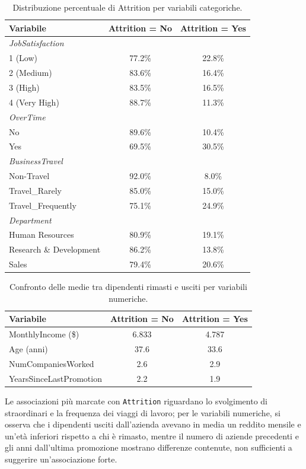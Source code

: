 \documentclass[12pt, a4paper]{article}
\begin{document}
\begin{table}[H]
\centering
\begin{tabular}{lcc}
\toprule
\textbf{Variabile} & \textbf{Attrition = No} & \textbf{Attrition = Yes} \\
\midrule
\multicolumn{3}{l}{\textit{JobSatisfaction}} \\
\midrule
1 (Low) & 77.2\% & 22.8\% \\
2 (Medium) & 83.6\% & 16.4\% \\
3 (High) & 83.5\% & 16.5\% \\
4 (Very High) & 88.7\% & 11.3\% \\
\midrule
\multicolumn{3}{l}{\textit{OverTime}} \\
\midrule
No & 89.6\% & 10.4\% \\
Yes & 69.5\% & 30.5\% \\
\midrule
\multicolumn{3}{l}{\textit{BusinessTravel}} \\
\midrule
Non-Travel & 92.0\% & 8.0\% \\
Travel\_Rarely & 85.0\% & 15.0\% \\
Travel\_Frequently & 75.1\% & 24.9\% \\
\midrule
\multicolumn{3}{l}{\textit{Department}} \\
\midrule
Human Resources & 80.9\% & 19.1\% \\
Research \& Development & 86.2\% & 13.8\% \\
Sales & 79.4\% & 20.6\% \\
\bottomrule
\end{tabular}
\caption{Distribuzione percentuale di Attrition per variabili categoriche.}
\end{table}

\begin{table}[H]
\centering
\begin{tabular}{lcc}
\toprule
\textbf{Variabile} & \textbf{Attrition = No} & \textbf{Attrition = Yes} \\
\midrule
MonthlyIncome (\$) & 6.833 & 4.787 \\
Age (anni) & 37.6 & 33.6 \\
NumCompaniesWorked & 2.6 & 2.9 \\
YearsSinceLastPromotion & 2.2 & 1.9 \\
\bottomrule
\end{tabular}
\caption{Confronto delle medie tra dipendenti rimasti e usciti per variabili numeriche.}
\end{table}
 
Le associazioni più marcate con \texttt{Attrition} riguardano lo svolgimento di straordinari e la frequenza dei viaggi di lavoro; per le variabili numeriche, si osserva che i dipendenti usciti dall'azienda avevano in media un reddito mensile e un'età inferiori rispetto a chi è rimasto, mentre il numero di aziende precedenti e gli anni dall'ultima promozione mostrano differenze contenute, non sufficienti a suggerire un'associazione forte.
\end{document}
